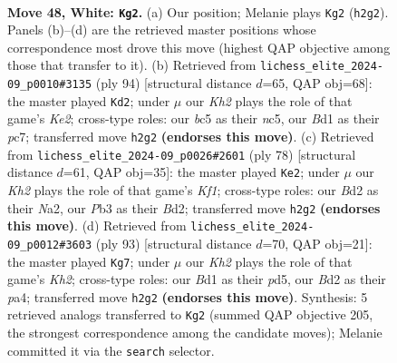 \documentclass[11pt]{article}
\begin{document}
\clearpage

\begin{figure}[p]\centering
\begin{subfigure}{0.46\textwidth}\centering
\resizebox{\linewidth}{!}{%
\newchessgame
\chessboard[
  setfen={1nb5/1p4k1/1n6/pNbp2p1/7p/PP2P2P/3BP2K/3B4 w - - 8 48},
  showmover=false,
  pgfstyle=straightmove, color=movearrow, markmove={h2-g2}
]}
\caption{}
\end{subfigure}\hfill
\begin{subfigure}{0.46\textwidth}\centering
\resizebox{\linewidth}{!}{%
\newchessgame
\chessboard[
  setfen={8/2pb2k1/5p2/2n1pP2/p1PpP2N/P2P4/2B1K3/8 w - - 3 48},
  showmover=false,
  pgfstyle=straightmove, color=movearrow, markmove={e2-d2}
]}
\caption{}
\end{subfigure}
\\[4pt]
\begin{subfigure}{0.46\textwidth}\centering
\resizebox{\linewidth}{!}{%
\newchessgame
\chessboard[
  setfen={1n6/3k4/3bp1p1/1p1p3p/1P1Pp3/4P1PP/N2B1P2/5K2 w - - 0 40},
  showmover=false,
  pgfstyle=straightmove, color=movearrow, markmove={f1-e2}
]}
\caption{}
\end{subfigure}\hfill
\begin{subfigure}{0.46\textwidth}\centering
\resizebox{\linewidth}{!}{%
\newchessgame
\chessboard[
  setfen={8/7k/3n1p1p/p2P3P/P1p2P2/1pN5/1Pb1B1P1/6K1 b - - 0 47},
  showmover=false,
  pgfstyle=straightmove, color=movearrow, markmove={h7-g7}
]}
\caption{}
\end{subfigure}
\caption{\textbf{Move 48, White: \texttt{Kg2}.} (a) Our position; Melanie plays \texttt{Kg2} (\texttt{h2g2}). Panels (b)--(d) are the retrieved master positions whose correspondence most drove this move (highest QAP objective among those that transfer to it). (b) Retrieved from \texttt{lichess\_elite\_2024-09\_p0010\#3135} (ply 94) [structural distance $d$=65, QAP obj=68]: the master played \texttt{Kd2}; under $\mu$ our \emph{Kh2} plays the role of that game's \emph{Ke2}; cross-type roles: our \emph{b}c5 as their \emph{n}c5, our \emph{B}d1 as their \emph{p}c7; transferred move \texttt{h2g2} \textbf{(endorses this move)}. (c) Retrieved from \texttt{lichess\_elite\_2024-09\_p0026\#2601} (ply 78) [structural distance $d$=61, QAP obj=35]: the master played \texttt{Ke2}; under $\mu$ our \emph{Kh2} plays the role of that game's \emph{Kf1}; cross-type roles: our \emph{B}d2 as their \emph{N}a2, our \emph{P}b3 as their \emph{B}d2; transferred move \texttt{h2g2} \textbf{(endorses this move)}. (d) Retrieved from \texttt{lichess\_elite\_2024-09\_p0012\#3603} (ply 93) [structural distance $d$=70, QAP obj=21]: the master played \texttt{Kg7}; under $\mu$ our \emph{Kh2} plays the role of that game's \emph{Kh2}; cross-type roles: our \emph{B}d1 as their \emph{p}d5, our \emph{B}d2 as their \emph{p}a4; transferred move \texttt{h2g2} \textbf{(endorses this move)}. Synthesis: 5 retrieved analogs transferred to \texttt{Kg2} (summed QAP objective 205, the strongest correspondence among the candidate moves); Melanie committed it via the \texttt{search} selector.}
\label{fig:thought-m94}
\end{figure}
\end{document}
